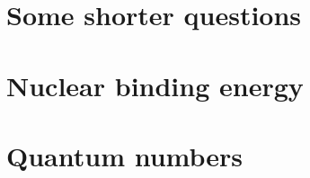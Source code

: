 \documentclass[]{article}
\begin{document}
\section{Some shorter questions}


\section{Nuclear binding energy}


\section{}

\section{}

\section{Quantum numbers}

\end{document}

